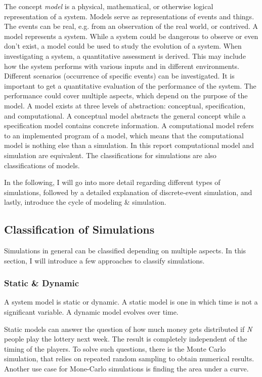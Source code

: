 The concept \textit{model} is a physical, mathematical, or otherwise logical
representation of a system. Models serve as representations of events and things. The events can be real, e.g. from an observation of the real world, or contrived. A model represents a system.
While a system could be dangerous to observe or even don't exist, a model could be used to study the evolution of a system. When investigating a system, a quantitative assessment is derived. This may include how the system performs with various inputs and in different environments.
Different scenarios (occurrence of specific events) can be investigated.  It is important to get a quantitative evaluation of the performance of the system. The performance could cover multiple aspects, which depend on the purpose of the model.
A model exists at three levels of abstraction: conceptual, specification, and computational. \cite[chapter 1]{leemis2006discrete} A conceptual model abstracts the general concept while a specification model contains concrete information. A computational model refers to an implemented program of a model, which means that the computational model is nothing else than a simulation. In this report computational model and simulation are equivalent. The classifications for simulations are also classifications of models.

In the following, I will go into more detail regarding different types of simulations, followed by a detailed explanation of discrete-event simulation, and lastly, introduce the cycle of modeling \& simulation.


\subsection{Classification of Simulations}


Simulations in general can be classified depending on multiple aspects. In this section, I will introduce a few approaches to classify simulations.

\subsubsection{Static \& Dynamic}

A system model is static or dynamic. A static model is one in which time
is not a significant variable. A dynamic model evolves over time. \cite{leemis2006discrete} 

Static models can answer the question of how much money gets distributed if \textit{N} people play the lottery next week. The result is completely independent of the timing of the players.
To solve such questions, there is the Monte Carlo simulation, that relies on repeated random sampling to obtain numerical results. Another use case for Mone-Carlo simulations is finding the area under a curve. \cite{ohriner1971finding}

